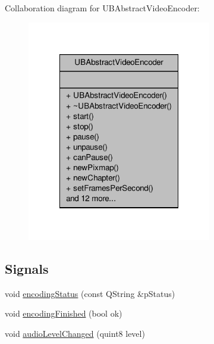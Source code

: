 Collaboration diagram for U\-B\-Abstract\-Video\-Encoder\-:
\nopagebreak
\begin{figure}[H]
\begin{center}
\leavevmode
\includegraphics[width=228pt]{d7/d19/class_u_b_abstract_video_encoder__coll__graph}
\end{center}
\end{figure}
\subsection*{Signals}
\begin{DoxyCompactItemize}
\item 
void \hyperlink{class_u_b_abstract_video_encoder_aac4ef445610633732ffc74e83450dda4}{encoding\-Status} (const Q\-String \&p\-Status)
\item 
void \hyperlink{class_u_b_abstract_video_encoder_aa4e03edd2cb73ad5ccb94daa23268b54}{encoding\-Finished} (bool ok)
\item 
void \hyperlink{class_u_b_abstract_video_encoder_a314566aa45510979eda49b487fd0113c}{audio\-Level\-Changed} (quint8 level)
\end{DoxyCompactItemize}
